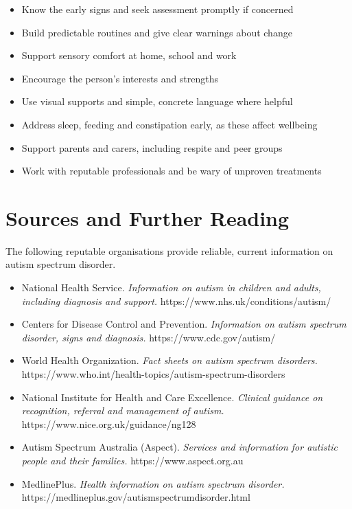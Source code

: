 \begin{itemize}
    \item Know the early signs and seek assessment promptly if concerned
    \item Build predictable routines and give clear warnings about change
    \item Support sensory comfort at home, school and work
    \item Encourage the person's interests and strengths
    \item Use visual supports and simple, concrete language where helpful
    \item Address sleep, feeding and constipation early, as these affect wellbeing
    \item Support parents and carers, including respite and peer groups
    \item Work with reputable professionals and be wary of unproven treatments
\end{itemize}

\section*{Sources and Further Reading}
The following reputable organisations provide reliable, current information on autism spectrum disorder.

\begin{itemize}
    \item National Health Service. \textit{Information on autism in children and adults, including diagnosis and support.} https://www.nhs.uk/conditions/autism/
    \item Centers for Disease Control and Prevention. \textit{Information on autism spectrum disorder, signs and diagnosis.} https://www.cdc.gov/autism/
    \item World Health Organization. \textit{Fact sheets on autism spectrum disorders.} https://www.who.int/health-topics/autism-spectrum-disorders
    \item National Institute for Health and Care Excellence. \textit{Clinical guidance on recognition, referral and management of autism.} https://www.nice.org.uk/guidance/ng128
    \item Autism Spectrum Australia (Aspect). \textit{Services and information for autistic people and their families.} https://www.aspect.org.au
    \item MedlinePlus. \textit{Health information on autism spectrum disorder.} https://medlineplus.gov/autismspectrumdisorder.html
\end{itemize}
